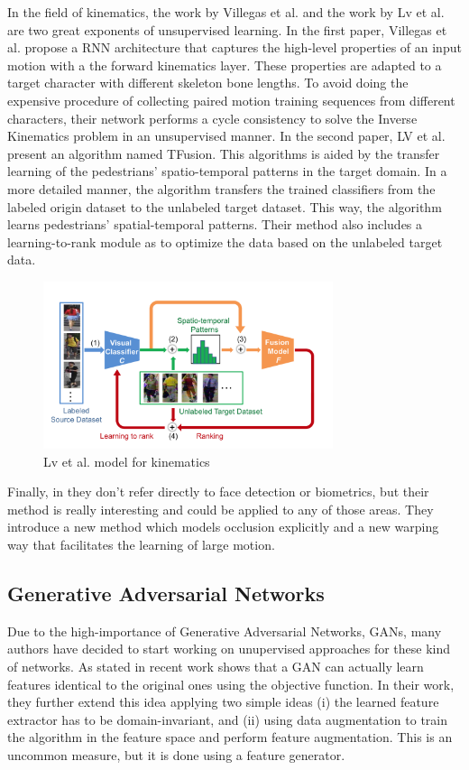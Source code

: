 \documentclass[letterpaper, 10 pt, conference]{ieeeconf}  %
\begin{document}
In the field of kinematics, the work by Villegas et al. \cite{Villegas_2018_CVPR} and the work by Lv et al. \cite{Lv_2018_CVPR} are two great exponents of unsupervised learning. In the first paper, Villegas et al. propose a RNN architecture that captures the high-level properties of an input motion with a the forward kinematics layer. These properties are adapted to a target character with different skeleton bone lengths. To avoid doing the expensive procedure of collecting paired motion training sequences from different characters, their network performs a cycle consistency to solve the Inverse Kinematics problem in an unsupervised manner. In the second paper, LV et al. present an algorithm named TFusion. This algorithms is aided by the transfer learning of the pedestrians’ spatio-temporal patterns in the target domain. In a more detailed manner, the algorithm transfers the trained classifiers from the labeled origin dataset to the unlabeled target dataset. This way, the algorithm learns pedestrians’ spatial-temporal patterns. Their method also includes a learning-to-rank module as to optimize the data based on the unlabeled target data. 

\begin{figure}[h!]
\centering
\includegraphics[width=8.5cm]{lvetal.png}
\caption{Lv et al. model for kinematics}
\label{fig:lvetal}
\end{figure}

Finally, in \cite{Wang_occlusion_2018_CVPR} they don't refer directly to face detection or biometrics, but their method is really interesting and could be applied to any of those areas. They introduce a new method which models occlusion explicitly and a new warping way that facilitates the learning of large motion. 

\subsection{Generative Adversarial Networks}

Due to the high-importance of Generative Adversarial Networks, GANs, many authors have decided to start working on unupervised approaches for these kind of networks. 
As stated in \cite{Volpi_2018_CVPR} recent work shows that a GAN can actually learn features identical to the original ones using the objective function. In their work, they further extend this idea applying two simple ideas (i) the learned feature extractor has to be domain-invariant, and (ii) using data augmentation to train the algorithm in the feature space and perform feature augmentation. This is an uncommon measure, but it is done using a feature generator.
\end{document}
